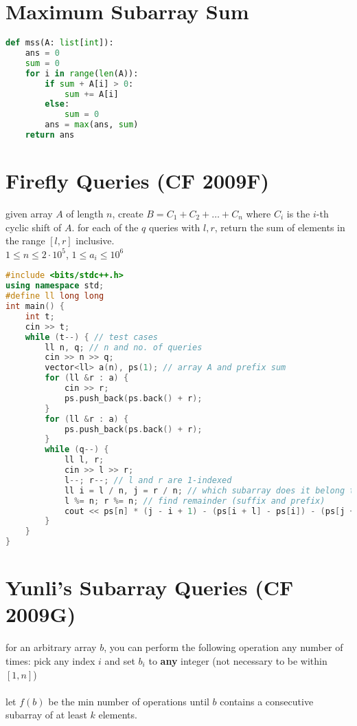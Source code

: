 \documentclass[11pt]{article}
\newcommand{\br}{\\\;\\} %
\begin{document}
\section{Maximum Subarray Sum}
\begin{lstlisting}[language=Python]
def mss(A: list[int]):
	ans = 0
	sum = 0
	for i in range(len(A)):
		if sum + A[i] > 0:
			sum += A[i]
		else:
			sum = 0
		ans = max(ans, sum)
	return ans
\end{lstlisting}

\section{Firefly Queries (CF 2009F)}
given array $A$ of length $n$, create $B = C_{1} + C_{2} + \dots + C_{n}$ where $C_{i}$ is the $i$-th cyclic shift of $A$. for each of the $q$ queries with $l, r$, return the sum of elements in the range $[l, r]$ inclusive. \\

$1 \leq n \leq 2\cdot 10^{5}$, $1 \leq a_{i} \leq 10^{6}$
\begin{lstlisting}[language=C++]
#include <bits/stdc++.h>
using namespace std;
#define ll long long
int main() {
    int t;
    cin >> t;
    while (t--) { // test cases
        ll n, q; // n and no. of queries
        cin >> n >> q;
        vector<ll> a(n), ps(1); // array A and prefix sum
        for (ll &r : a) {
            cin >> r;
            ps.push_back(ps.back() + r);
        }
        for (ll &r : a) {
            ps.push_back(ps.back() + r);
        }
        while (q--) {
            ll l, r; 
            cin >> l >> r;
            l--; r--; // l and r are 1-indexed
            ll i = l / n, j = r / n; // which subarray does it belong to
            l %= n; r %= n;	// find remainder (suffix and prefix)
            cout << ps[n] * (j - i + 1) - (ps[i + l] - ps[i]) - (ps[j + n] - ps[j + r + 1]) << "\n";
        }
    }
}
\end{lstlisting}

\section{Yunli's Subarray Queries (CF 2009G)}
for an arbitrary array $b$, you can perform the following operation any number of times: pick any index $i$ and set $b_{i}$ to \textbf{any} integer (not necessary to be within $[1, n]$)\br

let $f(b)$ be the min number of operations until $b$ contains a consecutive subarray of at least $k$ elements.\br
\end{document}
